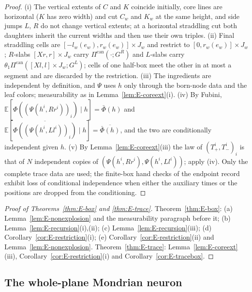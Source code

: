 \documentclass[11pt]{article}
\theoremstyle{plain}
\theoremstyle{definition}
\theoremstyle{remark}
\newcommand{\E}{\mathbb{E}}
\newcommand{\conj}[1]{\overline{#1}}
\begin{document}
\begin{proof}
(i) The vertical extents of $C$ and $K$ coincide initially, core lines are
horizontal ($K$ has zero width) and cut $C_w$ and $K_w$ at the same height, and side
jumps $L$, $R$ do not change vertical extents; at a horizontal straddling cut both
daughters inherit the current widths and then use their own triples. (ii) Final
straddling cells are $[-l_w(e_w),r_w(e_w)]\times J_w$ and restrict to $[0,r_w(e_w)]\times J_w$; $R$-slabs
$[Xr,r]\times J_w$ carry $\Pi^{\mathrm{can}}(\cdot;G^{R})$ and $L$-slabs carry $\theta_1\Pi^{\mathrm{can}}([Xl,l]\times J_w;G^{L})$; cells
of one half-box meet the other in at most a segment and are discarded by the
restriction. (iii) The ingredients are independent by definition, and $\Psi$ uses $h$
only through the born-node data and the leaf colors; measurability as in
Lemma~\ref{lem:E-coreext}(i). (iv) By Fubini,
$\E[\Phi((\Psi(h^{i},Rr^{i}))_i)\mid h]=\bar\Phi(h)$ and $\E[\conj{\Phi((\Psi(h^{i},Ll^{i}))_i)}\mid h]=\conj{\bar\Phi(h)}$, and the
two are conditionally independent given $h$. (v) By Lemma~\ref{lem:E-coreext}(iii) the
law of $(T^{i}_{+},T^{i}_{-})_i$ is that of $N$ independent copies of $(\Psi(h^{i},Rr^{i}),\Psi(h^{i},Ll^{i}))$;
apply (iv). Only the complete trace data are used; the finite-box hand checks of
the endpoint record exhibit loss of conditional independence when either the
auxiliary times or the positions are dropped from the conditioning.
\end{proof}

\begin{proof}[Proof of Theorems~\ref{thm:E-box} and \ref{thm:E-trace}]
Theorem~\ref{thm:E-box}: (a) Lemma~\ref{lem:E-nonexplosion} and the measurability
paragraph before it; (b) Lemma~\ref{lem:E-recursion}(i),(ii); (c)
Lemma~\ref{lem:E-recursion}(iii); (d) Corollary~\ref{cor:E-restriction}(i); (e)
Corollary~\ref{cor:E-restriction}(ii) and Lemma~\ref{lem:E-nonexplosion}.
Theorem~\ref{thm:E-trace}: Lemma~\ref{lem:E-coreext}(iii),
Corollary~\ref{cor:E-restriction}(i) and Corollary~\ref{cor:E-tracebox}.
\end{proof}

\subsection{The whole-plane Mondrian neuron}
\end{document}
